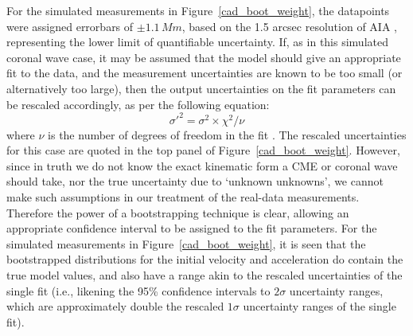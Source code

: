 \documentclass[structabstract]{aa}
\begin{document}
For the simulated measurements in Figure~\ref{cad_boot_weight}, the datapoints were assigned errorbars of $\pm1.1\,Mm$, based on the 1.5 arcsec resolution of AIA \citep{2012SoPh..275...17L}, representing the lower limit of quantifiable uncertainty. If, as in this simulated coronal wave case, it may be assumed that the model should give an appropriate fit to the data, and the measurement uncertainties are known to be too small (or alternatively too large), then the output uncertainties on the fit parameters can be rescaled accordingly, as per the following equation:
\begin{equation}
\sigma'^2 = \sigma^2 \times \chi^2 / \nu
\end{equation}
where $\nu$ is the number of degrees of freedom in the fit \citep[see, for example,][]{2003drea.book.....B}. The rescaled uncertainties for this case are quoted in the top panel of Figure~\ref{cad_boot_weight}. However, since in truth we do not know the exact kinematic form a CME or coronal wave should take, nor the true uncertainty due to `unknown unknowns', we cannot make such assumptions in our treatment of the real-data measurements. Therefore the power of a bootstrapping technique is clear, allowing an appropriate confidence interval to be assigned to the fit parameters. For the simulated measurements in Figure~\ref{cad_boot_weight}, it is seen that the bootstrapped distributions for the initial velocity and acceleration do contain the true model values, and also have a range akin to the rescaled uncertainties of the single fit (i.e., likening the 95\% confidence intervals to $2\sigma$ uncertainty ranges, which are approximately double the rescaled $1\sigma$ uncertainty ranges of the single fit).
\end{document}
